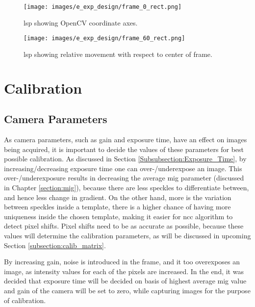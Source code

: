         \begin{figure}[h]
            \centering
            \texttt{[image: images/e\_exp\_design/frame\_0\_rect.png]}
            \caption{\gls{lsp} showing OpenCV coordinate axes.}
            \label{fig:frame_0_rect.png}
        \end{figure}
        
        \begin{figure}[h]
            \centering
            \texttt{[image: images/e\_exp\_design/frame\_60\_rect.png]}
            \caption{\gls{lsp} showing relative movement with respect to center of frame.}
            \label{fig:frame_60_rect.png}
        \end{figure}

\clearpage

\vspace{5mm}

\section{Calibration}\label{section:calibration}
    \subsection*{Camera Parameters}\label{subsection:camera_parameters}
        As camera parameters, such as gain and exposure time, have an effect on images being acquired, it is important to decide the values of these parameters for best possible calibration. As discussed in Section \ref{Subsubsection:Exposure_Time}, by increasing/decreasing exposure time one can over-/underexpose an image. This over-/underexposure results in decreasing the average \gls{mig} parameter (discussed in Chapter \ref{section:mig}), because there are less speckles to differentiate between, and hence less change in gradient. On the other hand, more is the variation between speckles inside a template, there is a higher chance of having more uniqueness inside the chosen template, making it easier for \gls{ncc} algorithm to detect pixel shifts. Pixel shifts need to be as accurate as possible, because these values will determine the calibration parameters, as will be discussed in upcoming Section \ref{subsection:calib_matrix}. 
        
        \vspace{5mm}
        \noindent By increasing gain, noise is introduced in the frame, and it too overexposes an image, as intensity values for each of the pixels are increased. In the end, it was decided that exposure time will be decided on basis of highest average \gls{mig} value and gain of the camera will be set to zero, while capturing images for the purpose of calibration.

